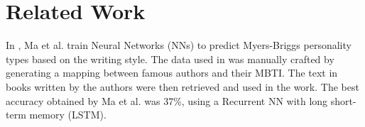 \section{Related Work} \label{sec:related-work}

In \cite{maneural}, Ma et al. train Neural Networks (NNs) to predict Myers-Briggs personality types based on the writing style.
The data used in \cite{maneural} was manually crafted by generating a mapping between famous authors and their MBTI.
The text in books written by the authors were then retrieved and used in the work.
The best accuracy obtained by Ma et al. was 37\%, using a Recurrent NN with long short-term memory (LSTM).
